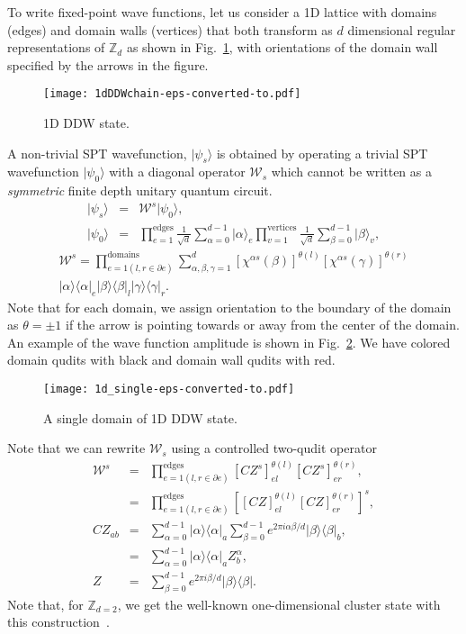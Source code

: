 \documentclass[aps,amsfonts,pra,twocolumn,showpacs]{revtex4-1}
\def\ket#1{\vert#1\rangle}
\newcommand{\outerproduct}[2]{|#1\rangle\langle #2|}
\newcommand{\zd}{\mathbb{Z}_d}
\begin{document}
To write fixed-point wave functions, let us consider a 1D lattice with domains (edges) and domain walls (vertices) that both transform as $d$ dimensional regular representations of $\zd$ as shown in Fig.~\ref{fig:1d_DDW}, with orientations of the domain wall specified by the arrows in the figure. 
\begin{figure}[!htb]
	\texttt{[image: 1dDDWchain-eps-converted-to.pdf]}
	\caption{1D DDW state. \label{fig:1d_DDW}}
\end{figure}
A non-trivial SPT wavefunction, $\ket{\psi_s}$ is obtained by operating a trivial SPT wavefunction $\ket{\psi_0}$ with a diagonal operator $\mathcal{W}_s$ which cannot be written as a \emph{symmetric} finite depth unitary quantum circuit. 
\begin{eqnarray}
\ket{\psi_s} &=& \mathcal{W}^s \ket{\psi_0}, \\
\ket{\psi_0} &=& \prod_{e=1}^\text{edges} \frac{1}{\sqrt{d}} \sum_{\alpha=0}^{d-1} \ket{\alpha}_e \prod_{v=1}^{\text{vertices}} \frac{1}{\sqrt{d}} \sum_{\beta=0}^{d-1} \ket{\beta}_v ,
\end{eqnarray}
\begin{multline}
\mathcal{W}^s = \prod_{e=1(l,r \in \partial e)}^{\text{domains}} \sum_{\alpha,\beta,\gamma=1}^d [\chi^{\alpha s}(\beta)]^{\theta(l)} [\chi^{\alpha s}(\gamma)]^{\theta(r)}\\
\outerproduct{\alpha}{\alpha}_e \outerproduct{\beta}{\beta}_l \outerproduct{\gamma}{\gamma}_r.
\end{multline}
Note that for each domain, we assign orientation to the boundary of the domain as $\theta = \pm 1$ if the arrow is pointing towards or away from the center of the domain. An example of the wave function amplitude is shown in Fig.~\ref{fig:1d_single}. We have colored domain qudits with black and domain wall qudits with red.
\begin{figure}[!htb]
	\texttt{[image: 1d\_single-eps-converted-to.pdf]}
	\caption{A single domain of 1D DDW state. \label{fig:1d_single}}
\end{figure}
Note that we can rewrite $\mathcal{W}_s$ using a controlled two-qudit operator
\begin{eqnarray}
\mathcal{W}^s &=& \prod_{e=1(l,r \in \partial e)}^{\text{edges}} [CZ^{s}]^{\theta(l)}_{el} [CZ^{s}]^{\theta(r)}_{er}, \nonumber \\
 &=& \prod_{e=1(l,r \in \partial e)}^{\text{edges}} \left[ [CZ]^{\theta(l)}_{el} [CZ]^{\theta(r)}_{er} \right]^s, \\
CZ_{ab} &=& \sum_{\alpha=0}^{d-1} \outerproduct{\alpha}{\alpha}_a \sum_{\beta=0}^{d-1} e^{2 \pi i  \alpha \beta /d} 
 \outerproduct{\beta}{\beta}_b, \nonumber \\
&=&  \sum_{\alpha=0}^{d-1} \outerproduct{\alpha}{\alpha}_a Z^{\alpha }_b, \\
Z &=& \sum_{\beta=0}^{d-1} e^{2 \pi i  \beta /d} 
\outerproduct{\beta}{\beta}.
\end{eqnarray}
Note that, for $\mathbb{Z}_{d=2}$, we get the well-known one-dimensional cluster state with this construction~\cite{Chen2014, Yoshida2017}.
\end{document}
